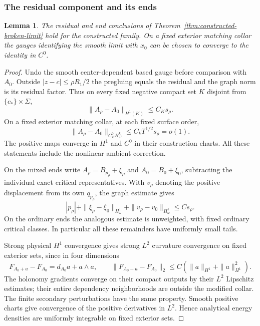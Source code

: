 \documentclass[11pt]{amsart}
\newtheorem{lemma}[theorem]{Lemma}
\theoremstyle{definition}
\theoremstyle{remark}
\theoremstyle{plain}
\begin{document}
\subsubsection{The residual component and its ends}

\begin{lemma}\label{lem:constructed-residual-limit}
The residual and end conclusions of
Theorem~\ref{thm:constructed-broken-limit} hold for the constructed family.
On a fixed exterior matching collar the gauges identifying the smooth
limit with $x_0$ can be chosen to converge to the identity in $C^0$.
\end{lemma}

\begin{proof}
Undo the smooth center-dependent based gauge before comparison with
$A_0$. Outside $|z-c|\leq\rho R_1/2$ the pregluing equals the residual
and the graph norm is its residual factor. Thus on every fixed negative
compact set $K$ disjoint from $\{c_*\}\times\Sigma$,
\begin{equation}\label{eq:constructed-exterior-hone}
                      \|A_\rho-A_0\|_{H^1(K)}\leq C_Ks_\rho.
\end{equation}
On a fixed exterior matching collar, at each fixed surface order,
\begin{equation}\label{eq:constructed-exterior-pointwise}
       \|A_\rho-A_0\|_{C^0_BH^k_\Sigma}\leq C_kT^{1/2}s_\rho=o(1).
\end{equation}
The positive maps converge in $H^1$ and $C^0$ in their construction
charts. All these statements include the nonlinear ambient correction.

On the mixed ends write $A_\rho=B_{p_\rho}+\xi_\rho$ and
$A_0=B_0+\xi_0$, subtracting the individual exact critical
representatives. With $v_\rho$ denoting the positive displacement from
its own $q_{p_\rho}$, the graph estimate gives
\begin{equation}\label{eq:constructed-end-subtraction}
 |p_\rho|+\|\xi_\rho-\xi_0\|_{H^1_\omega}
                +\|v_\rho-v_0\|_{H^1_\omega}\leq Cs_\rho.
\end{equation}
On the ordinary ends the analogous estimate is unweighted, with fixed
ordinary critical classes. In particular all these remainders have
uniformly small tails.

Strong physical $H^1$ convergence gives strong $L^2$ curvature
convergence on fixed exterior sets, since in four dimensions
\[
 F_{A_0+a}-F_{A_0}=d_{A_0}a+a\wedge a,\qquad
 \|F_{A_0+a}-F_{A_0}\|_2\leq C(\|a\|_{H^1}+\|a\|_{H^1}^2).
\]
The holonomy gradients converge on their compact outputs by their
$L^2$ Lipschitz estimates; their entire dependency neighborhoods are
outside the modified collar. The finite secondary perturbations have
the same property. Smooth positive charts give convergence of the
positive derivatives in $L^2$. Hence analytical energy densities are
uniformly integrable on fixed exterior sets.


\end{proof}
\end{document}
